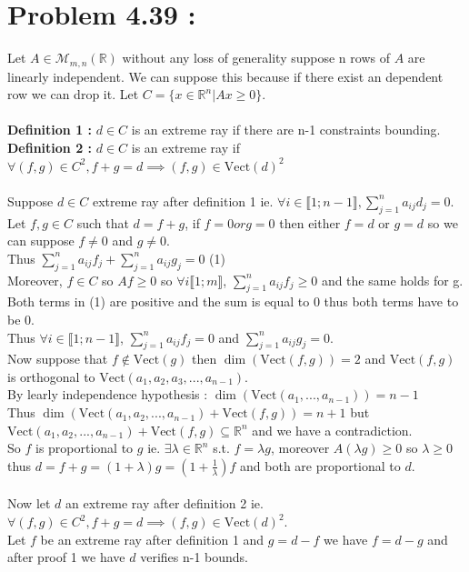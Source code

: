 \documentclass{article}
\begin{document}
\section*{Problem 4.39 :}
Let $A \in \mathcal{M}_{m,n}(\mathbb{R})$ without any loss of generality suppose n rows of $A$ are linearly independent. We can suppose this because if there exist an dependent row we can drop it. Let $C =\{x\in\mathbb{R}^n| Ax\ge 0\}$.
\\\\
\textbf{Definition 1 :} $d\in C$ is an extreme ray if there are n-1 constraints bounding.
\\
\textbf{Definition 2 :} $d\in C$ is an extreme ray if $\forall (f,g)\in C^2, f+g = d \implies (f,g)\in \text{Vect}(d)^2$
\\\\
Suppose $d\in C$ extreme ray after definition 1 ie. $\forall i\in\llbracket 1;n-1\rrbracket, \sum\limits_{j=1}^n a_{ij}d_j = 0$.
\\
Let $f,g\in C$ such that $d=f+g$, if $f =0 or g = 0$ then either $f=d$ or $g=d$ so we can suppose $f\neq 0$ and $g\neq 0$.
\\ 
Thus $\sum\limits_{j=1}^n a_{ij}f_{j} + \sum\limits_{j=1}^n a_{ij}g_{j} = 0$ (1)
\\
Moreover, $f\in C$ so $Af\ge 0$ so $\forall i \llbracket 1;m\rrbracket $, $\sum\limits_{j=1}^n a_{ij}f_j \ge 0$ and the same holds for g.
\\
Both terms in (1) are positive and the sum is equal to 0 thus both terms have to be 0.
\\
Thus $\forall i\in\llbracket 1;n-1\rrbracket$, $\sum\limits_{j=1}^n a_{ij}f_j = 0$ and $\sum\limits_{j=1}^n a_{ij}g_j = 0$.
\\
Now suppose that $f\notin \text{Vect}(g)$ then $\dim(\text{Vect}(f,g)) = 2$  and $\text{Vect}(f,g)$ is orthogonal to $\text{Vect}(a_1,a_2,a_3,...,a_{n-1})$.
\\
By learly independence hypothesis : $\dim(\text{Vect}(a_1,...,a_{n-1})) = n-1$ 
\\
Thus $\dim(\text{Vect}(a_1,a_2,...,a_{n-1})+\text{Vect}(f,g)) = n+1$ but $\text{Vect}(a_1,a_2,...,a_{n-1})+\text{Vect}(f,g)\subseteq\mathbb{R}^n$ and we have a contradiction.
\\
So $f$ is proportional to $g$ ie. $\exists \lambda\in\mathbb{R}^n$ s.t. $f = \lambda g$, moreover $A(\lambda g)\ge 0$ so $\lambda \ge 0$ thus $d = f+g = (1+\lambda) g = (1+\frac{1}{\lambda})f$ and both are proportional to $d$.
\\\\
Now let $d$ an extreme ray after definition 2 ie. $\forall (f,g)\in C^2, f+g = d \implies (f,g)\in \text{Vect}(d)^2$.
\\
Let $f$ be an extreme ray after definition 1 and $g = d-f$ we have $f = d - g$ and after proof 1 we have $d$ verifies n-1 bounds. 
\end{document}
